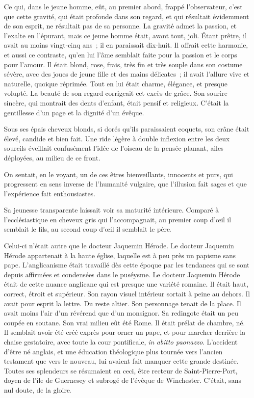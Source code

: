 \documentclass[french,twoside]{book} %
\begin{document}
Ce qui, dans le jeune homme, eût, au premier abord, frappé l’observateur, c’est que cette gravité, qui était profonde dans son regard, et qui résultait évidemment de son esprit, ne résultait pas de sa personne. La gravité admet la passion, et l’exalte en l’épurant, mais ce jeune homme était, avant tout, joli. Étant prêtre, il avait au moins vingt-cinq ans ; il en paraissait dix-huit. Il offrait cette harmonie, et aussi  ce contraste, qu’en lui l’âme semblait faite pour la passion et le corps pour l’amour. Il était blond, rose, frais, très fin et très souple dans son costume sévère, avec des joues de jeune fille et des mains délicates ; il avait l’allure vive et naturelle, quoique réprimée. Tout en lui était charme, élégance, et presque volupté. La beauté de son regard corrigeait cet excès de grâce. Son sourire sincère, qui montrait des dents d’enfant, était pensif et religieux. C’était la gentillesse d’un page et la dignité d’un évêque.\par
Sous ses épais cheveux blonds, si dorés qu’ils paraissaient coquets, son crâne était élevé, candide et bien fait. Une ride légère à double inflexion entre les deux sourcils éveillait confusément l’idée de l’oiseau de la pensée planant, ailes déployées, au milieu de ce front.\par
On sentait, en le voyant, un de ces êtres bienveillants, innocents et purs, qui progressent en sens inverse de l’humanité vulgaire, que l’illusion fait sages et que l’expérience fait enthousiastes.\par
Sa jeunesse transparente laissait voir sa maturité intérieure. Comparé à l’ecclésiastique en cheveux gris qui l’accompagnait, au premier coup d’œil il semblait le fils, au second coup d’œil il semblait le père.\par
Celui-ci n’était autre que le docteur Jaquemin Hérode. Le docteur Jaquemin Hérode appartenait à la haute église, laquelle est à peu près un papisme sans pape. L’anglicanisme était travaillé dès cette époque par les tendances qui se sont depuis affirmées et condensées dans le puséysme. Le docteur Jaquemin  Hérode était de cette nuance anglicane qui est presque une variété romaine. Il était haut, correct, étroit et supérieur. Son rayon visuel intérieur sortait à peine au dehors. Il avait pour esprit la lettre. Du reste altier. Son personnage tenait de la place. Il avait moins l’air d’un révérend que d’un monsignor. Sa redingote était un peu coupée en soutane. Son vrai milieu eût été Rome. Il était prélat de chambre, né. Il semblait avoir été créé exprès pour orner un pape, et pour marcher derrière la chaise gestatoire, avec toute la cour pontificale, \emph{in abitto paonazzo}. L’accident d’être né anglais, et une éducation théologique plus tournée vers l’ancien testament que vers le nouveau, lui avaient fait manquer cette grande destinée. Toutes ses splendeurs se résumaient en ceci, être recteur de Saint-Pierre-Port, doyen de l’île de Guernesey et subrogé de l’évêque de Winchester. C’était, sans nul doute, de la gloire.\par
\end{document}
